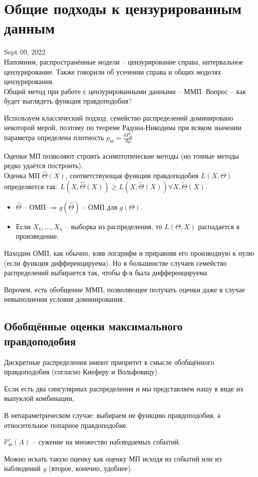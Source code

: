 \documentclass[main.tex]{subfiles}
\begin{document}
\section{ Общие подходы к цензурированным данным }

Sept 09, 2022 \\

Напомним, распространённые модели -- цензурирование справа, интервальное цензурирование.
Также говорили об усечении справа и общих моделях цензурирования. \\

Общий метод при работе с цензурированными данными -- ММП.
Вопрос -- как будет выглядеть функция правдоподобия?

Используем классический подход: семейство распределений доминировано некоторой мерой, поэтому по теореме Радона-Никодима при всяком значении параметра определена плотность $ p_{\Theta} = \frac{d P_{\Theta}}{d \mu} $

Оценки МП позволяют строить асимптотические методы (но точные методы редко удаётся построить). \\

Оценка МП $ \hat \Theta(X)  $, соответствующая функции правдоподобия $ L(X, \Theta) $ определяется так: $ L(X, \hat \Theta(X)) \ge L(X, \tilde \Theta(X)) \forall X, \tilde \Theta (X) $.

\begin{itemize}[noitemsep]
	\item $ \hat \Theta $ -- ОМП $ \Rightarrow g(\hat \Theta) $ -- ОМП для $ g(\Theta) $.
	\item Если $ X_1, \dots, X_n $ -- выборка из распределения, то $ L(\Theta, X) $ распадается в произведение. 
\end{itemize}

Находим ОМП, как обычно, взяв логарифм и приравняв его производную к нулю (если функция дифференцируема).
Но в большинстве случаев семейство распределений выбирается так, чтобы ф-я была дифференцируема.

Впрочем, есть обобщение ММП, позволяющее получать оценки даже в случае невыполнения условия доминирования.

\subsection{ Обобщённые оценки максимального правдоподобия }


Дискретные распределения имеют приоритет в смысле обобщённого правдоподобия (согласно Киеферу и Вольфовицу).

Если есть два сингулярных распределения и мы представляем нашу в виде их выпуклой комбинации,


В непараметрическом случае: выбираем не функцию правдоподобия, а относительное попарное правдоподобие.

$ \mathbb P_\Theta^r (A) $ -- сужение на множество наблюдаемых событий.

Можно искать такую оценку как оценку МП исходя из событий или из наблюдений $ y $ (второе, конечно, удобнее).
\end{document}
